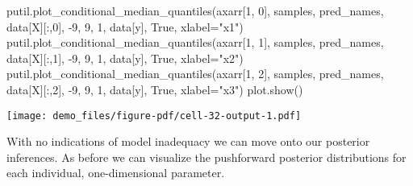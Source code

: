 \documentclass[
  letterpaper,
  DIV=11,
  numbers=noendperiod]{scrartcl}
\newenvironment{Shaded}{\begin{snugshade}}{\end{snugshade}}
\newcommand{\DecValTok}[1]{\textcolor[rgb]{0.68,0.00,0.00}{#1}}
\newcommand{\NormalTok}[1]{\textcolor[rgb]{0.00,0.23,0.31}{#1}}
\newcommand{\OperatorTok}[1]{\textcolor[rgb]{0.37,0.37,0.37}{#1}}
\newcommand{\StringTok}[1]{\textcolor[rgb]{0.13,0.47,0.30}{#1}}
\newcommand{\VariableTok}[1]{\textcolor[rgb]{0.07,0.07,0.07}{#1}}
\begin{document}
\begin{Shaded}
\begin{Highlighting}[]
\NormalTok{putil.plot\_conditional\_median\_quantiles(axarr[}\DecValTok{1}\NormalTok{, }\DecValTok{0}\NormalTok{], samples, pred\_names,}
\NormalTok{                                        data[}\StringTok{\textquotesingle{}X\textquotesingle{}}\NormalTok{][:,}\DecValTok{0}\NormalTok{], }\OperatorTok{{-}}\DecValTok{9}\NormalTok{, }\DecValTok{9}\NormalTok{, }\DecValTok{1}\NormalTok{,}
\NormalTok{                                        data[}\StringTok{\textquotesingle{}y\textquotesingle{}}\NormalTok{], }\VariableTok{True}\NormalTok{, xlabel}\OperatorTok{=}\StringTok{"x1"}\NormalTok{)}
\NormalTok{putil.plot\_conditional\_median\_quantiles(axarr[}\DecValTok{1}\NormalTok{, }\DecValTok{1}\NormalTok{], samples, pred\_names,}
\NormalTok{                                        data[}\StringTok{\textquotesingle{}X\textquotesingle{}}\NormalTok{][:,}\DecValTok{1}\NormalTok{], }\OperatorTok{{-}}\DecValTok{9}\NormalTok{, }\DecValTok{9}\NormalTok{, }\DecValTok{1}\NormalTok{,}
\NormalTok{                                        data[}\StringTok{\textquotesingle{}y\textquotesingle{}}\NormalTok{], }\VariableTok{True}\NormalTok{, xlabel}\OperatorTok{=}\StringTok{"x2"}\NormalTok{)}
\NormalTok{putil.plot\_conditional\_median\_quantiles(axarr[}\DecValTok{1}\NormalTok{, }\DecValTok{2}\NormalTok{], samples, pred\_names,}
\NormalTok{                                        data[}\StringTok{\textquotesingle{}X\textquotesingle{}}\NormalTok{][:,}\DecValTok{2}\NormalTok{], }\OperatorTok{{-}}\DecValTok{9}\NormalTok{, }\DecValTok{9}\NormalTok{, }\DecValTok{1}\NormalTok{,}
\NormalTok{                                        data[}\StringTok{\textquotesingle{}y\textquotesingle{}}\NormalTok{], }\VariableTok{True}\NormalTok{, xlabel}\OperatorTok{=}\StringTok{"x3"}\NormalTok{)}
\NormalTok{plot.show()}
\end{Highlighting}
\end{Shaded}

\texttt{[image: demo\_files/figure-pdf/cell-32-output-1.pdf]}

With no indications of model inadequacy we can move onto our posterior
inferences. As before we can visualize the pushforward posterior
distributions for each individual, one-dimensional parameter.
\end{document}
